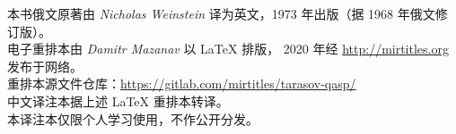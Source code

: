 \thispagestyle{empty}

{\noindent
本书俄文原著由 \emph{Nicholas Weinstein} 译为英文，1973 年出版（据 1968 年俄文修订版）。\\[4pt]
电子重排本由 \emph{Damitr Mazanav} 以 \LaTeX{} 排版，
2020 年经 \url{http://mirtitles.org} 发布于网络。\\
重排本源文件仓库：\url{https://gitlab.com/mirtitles/tarasov-qasp/}\\[10pt]
中文译注本据上述 \LaTeX{} 重排本转译。\\
本译注本仅限个人学习使用，不作公开分发。}

\cleardoublepage
